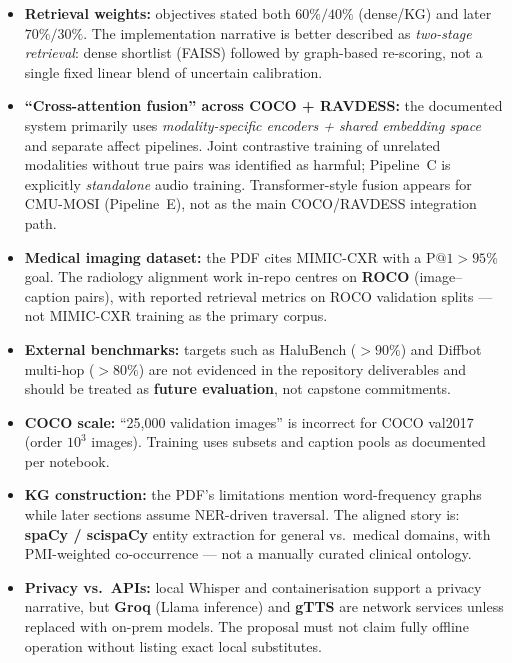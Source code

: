 \documentclass[12pt,a4paper]{article}
\begin{document}
\begin{itemize}[nosep]
  \item \textbf{Retrieval weights:} objectives stated both $60\%/40\%$ (dense/KG) and
        later $70\%/30\%$. The implementation narrative is better described as
        \emph{two-stage retrieval}: dense shortlist (FAISS) followed by graph-based
        re-scoring, not a single fixed linear blend of uncertain calibration.
  \item \textbf{``Cross-attention fusion'' across COCO + RAVDESS:} the documented system
        primarily uses \emph{modality-specific encoders + shared embedding space} and
        separate affect pipelines. Joint contrastive training of unrelated modalities
        without true pairs was identified as harmful; Pipeline~C is explicitly
        \emph{standalone} audio training. Transformer-style fusion appears for CMU-MOSI
        (Pipeline~E), not as the main COCO/RAVDESS integration path.
  \item \textbf{Medical imaging dataset:} the PDF cites MIMIC-CXR with a
        $\mathrm{P@}1 > 95\%$ goal. The radiology alignment work in-repo centres on
        \textbf{ROCO} (image--caption pairs), with reported retrieval metrics on ROCO
        validation splits --- not MIMIC-CXR training as the primary corpus.
  \item \textbf{External benchmarks:} targets such as HaluBench ($>90\%$) and Diffbot
        multi-hop ($>80\%$) are not evidenced in the repository deliverables and should
        be treated as \textbf{future evaluation}, not capstone commitments.
  \item \textbf{COCO scale:} ``25{,}000 validation images'' is incorrect for COCO
        val2017 (order $10^3$ images). Training uses subsets and caption pools as
        documented per notebook.
  \item \textbf{KG construction:} the PDF's limitations mention word-frequency graphs
        while later sections assume NER-driven traversal. The aligned story is:
        \textbf{spaCy / scispaCy} entity extraction for general vs.\ medical domains,
        with PMI-weighted co-occurrence --- not a manually curated clinical ontology.
  \item \textbf{Privacy vs.\ APIs:} local Whisper and containerisation support a
        privacy narrative, but \textbf{Groq} (Llama inference) and \textbf{gTTS} are
        network services unless replaced with on-prem models. The proposal must not
        claim fully offline operation without listing exact local substitutes.
\end{itemize}
\end{document}
